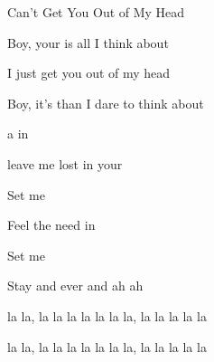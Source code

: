\begin{SBSong}{Can't Get You Out of My Head}
\begin{SBVerse}
    Boy, your  is all I think about

    I just  get you out of my head

    Boy, it's  than I dare to think about

     a   in 

     leave me lost in your 

    Set me  

    Feel the need in  

    Set me  

    Stay  and ever and  ah ah

     la la, la la la la la  la la, la la la la la

     la la, la la la la la  la la, la la la la la
  \end{SBVerse}
\end{SBSong}

